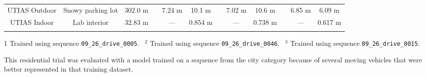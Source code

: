 \begin{table}
{\begin{threeparttable}
\begin{tabular}{cccccccccccc}
                UTIAS Outdoor & Snowy parking lot & 302.0 m && 7.24 m & 10.1 m && 7.02 m & 10.6 m && 6.85 m & 6.09 m \\ 
                UTIAS Indoor & Lab interior & 32.83 m && --- & 0.854 m && --- & 0.738 m && --- & 0.617 m  \B \\    
        \hline
            \label{table:probe_kitti_data}
        \end{tabular}
        \begin{tablenotes}
            \item[1] Trained using sequence \texttt{09\_26\_drive\_0005}. ~$^2$ Trained using sequence  \texttt{09\_26\_drive\_0046}. ~$^3$ Trained using sequence  \texttt{09\_26\_drive\_0015}.  
            \item[\dag] This residential trial was evaluated with a model trained on a sequence from the city category because of several moving vehicles that were better represented in that training dataset.
        \end{tablenotes}
    \end{threeparttable}
    }
\end{table}

